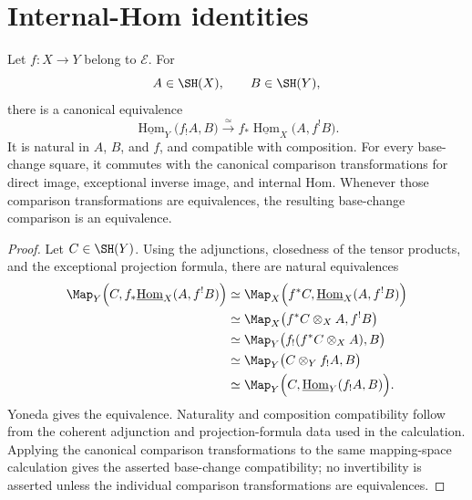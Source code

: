 \section{Internal-Hom identities}
\label{sec:exceptional-internal-hom}

\begin{theorem}
\label{thm:exceptional-hom-projection}
Let \(f:X\to Y\) belong to \(\mathcal E\).  For
\[
    A\in\SH(X),
    \qquad
    B\in\SH(Y),
\]
there is a canonical equivalence
\[
    \underline{\operatorname{Hom}}_Y
    \bigl(
      f_!A,
      B
    \bigr)
    \xrightarrow{\simeq}
    f_*
    \underline{\operatorname{Hom}}_X
    \bigl(
      A,
      f^!B
    \bigr).
\]
It is natural in \(A\), \(B\), and \(f\), and compatible with composition.
For every base-change square, it commutes with the canonical comparison
transformations for direct image, exceptional inverse image, and internal
Hom.  Whenever those comparison transformations are equivalences, the
resulting base-change comparison is an equivalence.
\end{theorem}

\begin{proof}
Let \(C\in\SH(Y)\).  Using the adjunctions, closedness of the tensor
products, and the exceptional projection formula, there are natural
equivalences
\[
\begin{aligned}
    \Map_Y
    \Bigl(
      C,
      f_*\underline{\operatorname{Hom}}_X(A,f^!B)
    \Bigr)
    &\simeq
    \Map_X
    \Bigl(
      f^*C,
      \underline{\operatorname{Hom}}_X(A,f^!B)
    \Bigr) \\
    &\simeq
    \Map_X
    \bigl(
      f^*C\otimes_XA,
      f^!B
    \bigr) \\
    &\simeq
    \Map_Y
    \bigl(
      f_!(f^*C\otimes_XA),
      B
    \bigr) \\
    &\simeq
    \Map_Y
    \bigl(
      C\otimes_Yf_!A,
      B
    \bigr) \\
    &\simeq
    \Map_Y
    \Bigl(
      C,
      \underline{\operatorname{Hom}}_Y(f_!A,B)
    \Bigr).
\end{aligned}
\]
Yoneda gives the equivalence.  Naturality and composition compatibility
follow from the coherent adjunction and projection-formula data used in the
calculation.  Applying the canonical comparison transformations to the same
mapping-space calculation gives the asserted base-change compatibility; no
invertibility is asserted unless the individual comparison transformations
are equivalences.
\end{proof}

